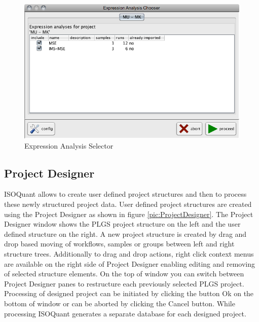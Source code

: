 \documentclass[]{article}
\begin{document}
\begin{figure}[htbp]
\centering
\includegraphics{pic/expression_analysis_selector.png}
\caption{Expression Analysis Selector \label{pic:EASelector}}
\end{figure}

\clearpage

\subsection{\texorpdfstring{Project Designer
\label{sec:ProjectDesigner}}{Project Designer }}\label{project-designer}

ISOQuant allows to create user defined project structures and then to
process these newly structured project data. User defined project
structures are created using the Project Designer as shown in figure
\ref{pic:ProjectDesigner}. The Project Designer window shows the PLGS
project structure on the left and the user defined structure on the
right. A new project structure is created by drag and drop based moving
of workflows, samples or groups between left and right structure trees.
Additionally to drag and drop actions, right click context menus are
available on the right side of Project Designer enabling editing and
removing of selected structure elements. On the top of window you can
switch between Project Designer panes to restructure each previously
selected PLGS project. Processing of designed project can be initiated
by clicking the button Ok on the bottom of window or can be aborted by
clicking the Cancel button. While processing ISOQuant generates a
separate database for each designed project.
\end{document}
